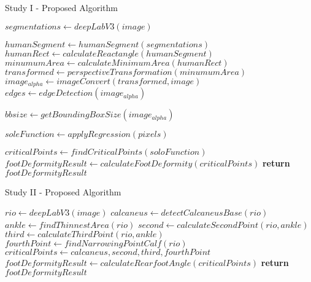 \documentclass[a4paper,11pt]{article}
\begin{document}
 

\begin{algorithm}
	\caption{Study I - Proposed Algorithm} 
	\begin{algorithmic}[1]
	     
	        \State $segmentations\gets deepLabV3(image)$ 
	        
	        \State $humanSegment\gets humanSegment(segmentations)$
	        \State $humanRect\gets calculateReactangle(humanSegment)$
	        \State $minumumArea\gets calculateMinimumArea(humanRect)$
	        \State $transformed\gets perspectiveTransformation(minumumArea)$
	        \State $image_{alpha}\gets imageConvert(transformed,image)$
	        \State $edges\gets edgeDetection(image_{alpha})$
	        
	        \State $bbsize\gets getBoundingBoxSize(image_{alpha})$
	        
	         
	                \State $soleFunction\gets applyRegression(pixels)$
	            \EndFor
	        \EndFor
	        
	        \State $criticalPoints\gets findCriticalPoints(soloFunction)$
	        \State $footDeformityResult\gets calculateFootDeformity(criticalPoints)$ 
	        \State \textbf{return} $footDeformityResult$
    	\EndProcedure
	\end{algorithmic} 
\end{algorithm}

\begin{algorithm}
	\caption{Study II - Proposed Algorithm} 
	\begin{algorithmic}[1]
	     
	        \State $rio\gets deepLabV3(image)$ 
	        \State $calcaneus\gets detectCalcaneusBase(rio)$ 
	        \State $ankle\gets findThinnestArea(rio)$
	        \State $second\gets calculateSecondPoint(rio,ankle)$
	        \State $third\gets calculateThirdPoint(rio,ankle)$
	        \State $fourthPoint\gets findNarrowingPointCalf(rio)$
	        \State $criticalPoints\gets calcaneus,second,third,fourthPoint$
	        \State $footDeformityResult\gets calculateRearfootAngle(criticalPoints)$ 
	        \State \textbf{return} $footDeformityResult$
    	\EndProcedure
	\end{algorithmic} 
\end{algorithm}
\end{document}
